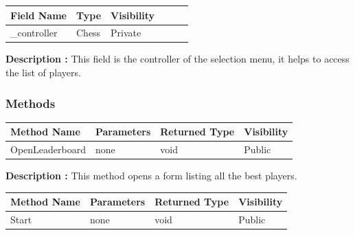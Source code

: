 \documentclass[12pt]{article}
\begin{document}
    \begin{table}[H]
        \begin{tabular}{llllll}
            \hline
            \multicolumn{1}{|l|}{\cellcolor[HTML]{EFEFEF}\textbf{Field Name}} & \multicolumn{1}{l|}{\cellcolor[HTML]{EFEFEF}\textbf{Type}} & \multicolumn{1}{l|}{\cellcolor[HTML]{EFEFEF}\textbf{Visibility}} \\ \hline
            \multicolumn{1}{|l|}{\_controller}                                & \multicolumn{1}{l|}{Chess}                                 & \multicolumn{1}{l|}{Private}                                     \\ \hline
        \end{tabular}
    \end{table}

    \textbf{Description :} This field is the controller of the selection menu, it helps to access the list of players.

    \subsubsection{Methods}

    \begin{table}[H]
        \begin{tabular}{|l|l|l|l|}
            \hline
            \rowcolor[HTML]{EFEFEF}
            \cellcolor[HTML]{EFEFEF}\textbf{Method Name} & \textbf{Parameters} & \textbf{Returned Type} & \textbf{Visibility} \\ \hline
            OpenLeaderboard                              & none                & void                   & Public              \\ \hline
        \end{tabular}
    \end{table}

    \textbf{Description :} This method opens a form listing all the best players.

    \begin{table}[H]
        \begin{tabular}{|l|l|l|l|}
            \hline
            \rowcolor[HTML]{EFEFEF}
            \cellcolor[HTML]{EFEFEF}\textbf{Method Name} & \textbf{Parameters} & \textbf{Returned Type} & \textbf{Visibility} \\ \hline
            Start                                        & none                & void                   & Public              \\ \hline
        \end{tabular}
    \end{table}
\end{document}
